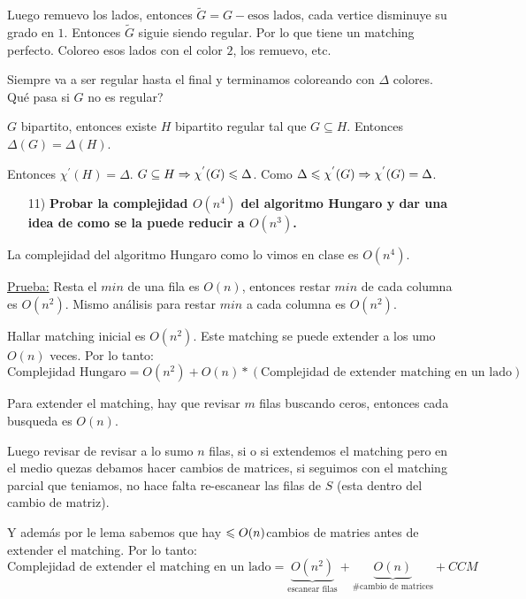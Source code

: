 \documentclass[12pt,a4paper]{article}
\begin{document}
Luego remuevo los lados, entonces $\widetilde{G} = G -\text{esos lados}$, cada 
vertice disminuye su grado en $1$. Entonces $\widetilde{G}$ siguie siendo regular. 
Por lo que tiene un matching perfecto. Coloreo esos lados con el color $2$, los remuevo, etc.
\medskip

Siempre va a ser regular hasta el final y terminamos coloreando con $\Delta$ colores. 
Qué pasa si $G$ no es regular?

\begin{lema} $G$ bipartito, entonces existe $H$ bipartito regular tal que 
    $G \subseteq H$. Entonces $\Delta(G) = \Delta(H)$.
\end{lema}

Entonces $\chi^{'}(H) = \Delta$. $G \subseteq H \Rightarrow \chi^{'}(G) \leqslant \Delta$. 
Como $\Delta \leqslant \chi^{'}(G) \Rightarrow \chi^{'}(G) = \Delta$.

\begin{itemize}
    \item [11)] \textbf{Probar la complejidad $O(n^{4})$ del algoritmo Hungaro y dar una idea 
    de como se la puede reducir a $O(n^{3})$.}
    \label{dem:hungaro}
\end{itemize}

\begin{teorema} La complejidad del algoritmo Hungaro como lo vimos en clase es $O(n^4)$.
\end{teorema}

\underline{Prueba:} Resta el $min$ de una fila es $O(n)$, entonces restar $min$ de 
cada columna es $O(n^2)$. Mismo análisis para restar $min$ a cada columna es $O(n^{2})$.
\medskip

Hallar matching inicial es $O(n^2)$. Este matching se puede extender a los umo 
$O(n)$ veces. Por lo tanto:
$$\text{Complejidad Hungaro} = O(n^2) + O(n)*(\text{Complejidad de extender matching en un lado})$$

Para extender el matching, hay que revisar $m$ filas buscando ceros, entonces cada 
busqueda es $O(n)$.
\medskip

Luego revisar de revisar a lo sumo $n$ filas, si o si extendemos el matching pero 
en el medio quezas debamos hacer cambios de matrices, si seguimos con el matching 
parcial que teniamos, no hace falta re-escanear las filas de $S$ (esta dentro del 
cambio de matriz).
\medskip

Y además por le lema sabemos que hay $\leqslant O(n)$cambios de matries antes de extender 
el matching. Por lo tanto:
$$\text{Complejidad de extender el matching en un lado} = \underbrace{O(n^{2})}_{\text{escanear filas}} + \underbrace{O(n)}_{\text{\# cambio de matrices}} + CCM$$
\end{document}
